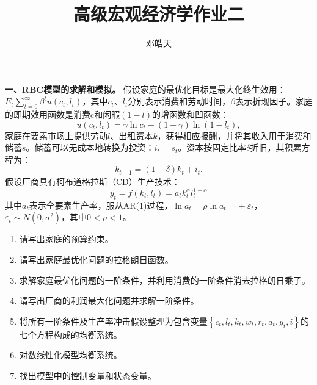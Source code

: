 \documentclass[12pt, a4paper, oneside]{article}
\title{\vspace{-3.3cm}\textbf{高级宏观经济学作业二}}
\author{邓皓天\quad 2023310114}
\date{}
\newcounter{problemname}
\newenvironment{problem}{\stepcounter{problemname}\par\noindent\textbf{}}{\par}
\begin{document}
\begin{CJK*}{UTF8}{gbsn}
\maketitle

\begin{problem}
	\textbf{一、RBC模型的求解和模拟。}
	假设家庭的最优化目标是最大化终生效用：$E_{t}\sum_{t=0}^{\infty}\beta^{t}u\left(c_{t},l_{t}\right)$，其中$c_{t}$、$l_{t}$分别表示消费和劳动时间，$\beta$表示折现因子。家庭的即期效用函数是消费c和闲暇$\left(1-l\right)$的增函数和凹函数：
	\[
	u\left(c_{t},l_{t}\right)=\gamma\ln c_{t}+\left(1-\gamma\right)\ln\left(1-l_{t}\right),
	\]
	家庭在要素市场上提供劳动$l$、出租资本$k$，获得相应报酬，并将其收入用于消费和储蓄$s$。储蓄可以无成本地转换为投资：$i_{t}=s_{t}$。资本按固定比率$\delta$折旧，其积累方程为：
	\[
	k_{t+1}=\left(1-\delta\right)k_{t}+i_{t}.
	\]
	假设厂商具有柯布道格拉斯（CD）生产技术：
	\[
	y_{t}=f\left(k_{t},l_{t}\right)=a_{t}k_{t}^{\alpha}l_{t}^{1-\alpha}
	\]
	其中$a_{t}$表示全要素生产率，服从AR(1)过程，$\ln a_{t}=\rho\ln a_{t-1}+\varepsilon_{t}$，$\varepsilon_{t}\sim N\left(0,\sigma^{2}\right)$，其中$0<\rho<1$。
	
	\begin{enumerate}
\item 请写出家庭的预算约束。
\item 请写出家庭最优化问题的拉格朗日函数。
\item 求解家庭最优化问题的一阶条件，并利用消费的一阶条件消去拉格朗日乘子。
\item 请写出厂商的利润最大化问题并求解一阶条件。
\item 将所有一阶条件及生产率冲击假设整理为包含变量$\left\{ c_{t},l_{t},k_{t},w_{t},r_{t},a_{t},y_{t},i\right\} $的七个方程构成的均衡系统。
\item 对数线性化模型均衡系统。
\item 找出模型中的控制变量和状态变量。


\end{enumerate}
\end{problem}
\end{CJK*}
\end{document}
